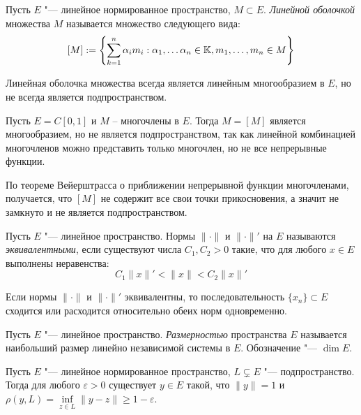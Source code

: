 \begin{definition}
	Пусть $E$ "--- линейное нормированное пространство, $M \subset E$. \textit{Линейной оболочкой} множества $M$ называется множество следующего вида:
	\[[M] := \left\{\sum_{k = 1}^n \alpha_im_i : \alpha_1, \dotsc \alpha_n \in \mathbb{K}, m_1, \dotsc, m_n \in M\right\}\]
\end{definition}

\begin{note}
	Линейная оболочка множества всегда является линейным многообразием в $E$, но не всегда является подпространством.
\end{note}

\begin{example}
    Пусть $E = C[0,1]$ и $M$ -- многочлены в $E$. Тогда $M = [M]$ является многообразием, но не является подпространством, так как линейной комбинацией многочленов можно представить только многочлен, но не все непрерывные функции.
    
    По теореме Вейерштрасса о приближении непрерывной функции многочленами, получается, что $[M]$ не содержит все свои точки прикосновения, а значит не замкнуто и не является подпространством.
\end{example}

\begin{definition}
	Пусть $E$ "--- линейное пространство. Нормы $\|\cdot\|$ и $\|\cdot\|'$ на $E$ называются \textit{эквивалентными}, если существуют числа $C_1, C_2 > 0$ такие, что для любого $x \in E$ выполнены неравенства:
	\[C_1\|x\|' < \|x\| < C_2\|x\|'\]
\end{definition}

\begin{note}
	Если нормы $\|\cdot\|$ и $\|\cdot\|'$ эквивалентны, то последовательность $\{x_n\} \subset E$ сходится или расходится относительно обеих норм одновременно.
\end{note}

\begin{definition}
	Пусть $E$ "--- линейное пространство. \textit{Размерностью} пространства $E$ называется наибольший размер линейно независимой системы в $E$. Обозначение "--- $\dim E$.
\end{definition}

\begin{proposition}\label{almostperp}
	Пусть $E$ "--- линейное нормированное пространство, $L \subsetneq E$ "--- подпространство. Тогда для любого $\varepsilon > 0$ существует $y \in E$ такой, что $\|y\| = 1$ и $\rho(y, L) = \inf\limits_{z \in L}\|y - z\| \geqslant 1 - \varepsilon$.
\end{proposition}

